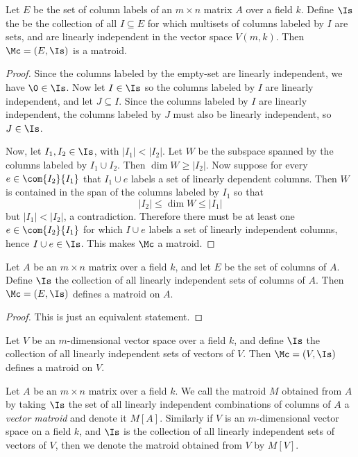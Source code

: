 \begin{proposition}\label{proposition_1.1.1}
  Let $E$ be the set of column labels of an  $m \times n$ matrix $A$
  over a field $k$. Define $\Is$ the be the collection of all $I
  \subseteq E$ for which multisets of columns labeled by $I$ are sets,
  and are linearly independent in the vector space $V(m,k)$. Then
  $\Mc=(E,\Is)$ is a matroid.
\end{proposition}
\begin{proof}
  Since the columns labeled by the empty-set are linearly independent,
  we have $\0 \in \Is$. Now let $I \in \Is$ so the columns labeled by
  $I$ are linearly independent, and let $J \subseteq I$. Since the
  columns labeled by $I$ are linearly independent, the columns labeled
  by $J$ must also be linearly independent, so $J \in \Is$.

  Now, let $I_1, I_2 \in \Is$, with $|I_1|<|I_2|$. Let $W$ be the
  subspace spanned by the columns labeled by $I_1 \cup I_2$. Then
  $\dim{W} \geq |I_2|$. Now suppose for every $e \in \com{I_2}{I_1}$
  that $I_1 \cup e$ labels a set of linearly dependent columns. Then
  $W$ is contained in the span of the columns labeled by $I_1$ so that
  \begin{equation*}
    |I_2| \leq \dim{W} \leq |I_1|
  \end{equation*}
  but $|I_1|<|I_2|$, a contradiction. Therefore there must be at least
  one $e \in \com{I_2}{I_1}$ for which $I \cup e$ labels a set of
  linearly independent columns, hence $I \cup e \in \Is$. This makes
  $\Mc$ a matroid.
\end{proof}
\begin{corollary}
  Let $A$ be an $m \times n$ matrix over a field $k$, and let $E$ be
  the set of columns of $A$. Define $\Is$ the collection of all
  linearly independent sets of columns of $A$. Then $\Mc=(E,\Is)$
  defines a matroid on $A$.
\end{corollary}
\begin{proof}
  This is just an equivalent statement.
\end{proof}
\begin{corollary}
  Let $V$ be an $m$-dimensional vector space over a field $k$, and
  define $\Is$ the collection of all linearly independent sets of
  vectors of $V$. Then $\Mc=(V,\Is)$ defines a matroid on $V$.
\end{corollary}

\begin{definition}
  Let $A$ be an $m \times n$ matrix over a field $k$. We call the
  matroid $M$ obtained from $A$ by taking $\Is$ the set of all
  linearly independent combinations of columns of $A$ a
  \textit{vector matroid} and denote it $M[A]$. Similarly if $V$
  is an $m$-dimensional vector space on a field $k$, and $\Is$ is the
  collection of all linearly independent sets of vectors of $V$, then
  we denote the matroid obtained from $V$ by $M[V]$.
\end{definition}

